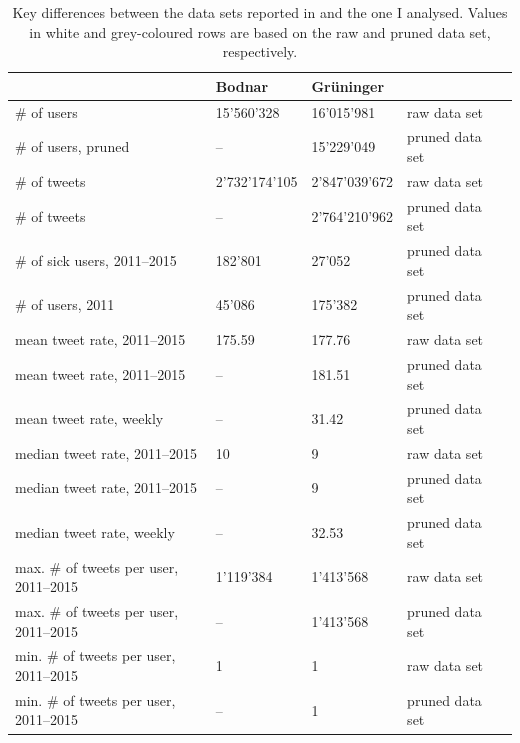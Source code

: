 \documentclass[11pt, a4paper,twoside]{report}\usepackage[]{graphicx}\usepackage[]{color}
\begin{document}
\begin{table}[htbp!]
\centering
\caption{Key differences between the data sets reported in \cite{bodnar_data_2015} and the one I analysed. Values in white and grey-coloured rows are based on the raw and pruned data set, respectively.}
\begin{tabular}{l l l l l}
 & Bodnar  & Grüninger & \\ \hline
\# of users  & 15'560'328 & 16'015'981 & raw data set  \\
\cellcolor{grey}\# of users, pruned & \cellcolor{grey}-- & \cellcolor{grey}15'229'049 & \cellcolor{grey}pruned data set\\
\# of tweets  & 2'732'174'105 & 2'847'039'672 & raw data set  \\ 
\cellcolor{grey}\# of tweets  & \cellcolor{grey}-- & \cellcolor{grey}2'764'210'962 & \cellcolor{grey}pruned data set \\
\cellcolor{grey}\# of sick users, 2011--2015 & \cellcolor{grey}182'801 & \cellcolor{grey}27'052 & \cellcolor{grey}pruned data set  \\
\cellcolor{grey}\# of users, 2011 & \cellcolor{grey}45'086 & \cellcolor{grey}175'382 & \cellcolor{grey}pruned data set\\
mean tweet rate, 2011--2015 & 175.59 & 177.76 & raw data set\\
\cellcolor{grey}mean tweet rate, 2011--2015 & \cellcolor{grey}-- & \cellcolor{grey}181.51 & \cellcolor{grey}pruned data set \\
\cellcolor{grey}mean tweet rate, weekly & \cellcolor{grey}-- & \cellcolor{grey}31.42 & \cellcolor{grey}pruned data set\\
median tweet rate, 2011--2015 & 10 & 9 & raw data set\\
\cellcolor{grey}median tweet rate, 2011--2015 & \cellcolor{grey}-- & \cellcolor{grey}9 & \cellcolor{grey}pruned data set\\
\cellcolor{grey}median tweet rate, weekly & \cellcolor{grey}-- & \cellcolor{grey}32.53 & \cellcolor{grey}pruned data set\\
max. \# of tweets per user, 2011--2015 &  1'119'384 & 1'413'568 & raw data set\\
\cellcolor{grey}max. \# of tweets per user, 2011--2015 & \cellcolor{grey}-- & \cellcolor{grey}1'413'568 & \cellcolor{grey}pruned data set\\
min. \# of tweets per user, 2011--2015 & 1 & 1 & raw data set\\
\cellcolor{grey}min. \# of tweets per user, 2011--2015 & \cellcolor{grey}-- & \cellcolor{grey}1 & \cellcolor{grey}pruned data set\\
\end{tabular}
\label{tab:data_set_diff}
\end{table}
\end{document}

